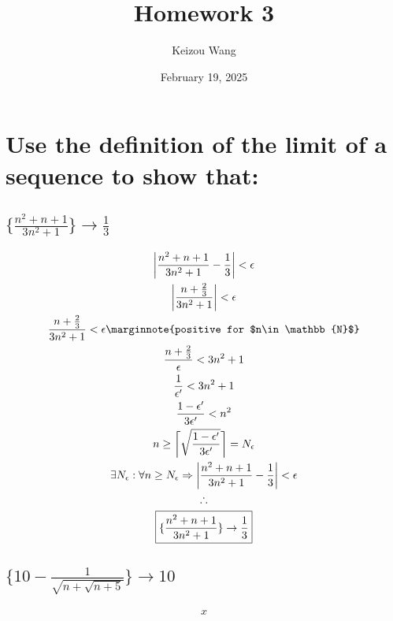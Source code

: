 \documentclass[letterpaper]{article}
\title{Homework 3}
\author{Keizou Wang}
\date{February 19, 2025}
\DeclarePairedDelimiter{\ceil}{\lceil}{\rceil}
\DeclarePairedDelimiter\abs{\lvert}{\rvert}
\begin{document}
\maketitle

\section{Use the definition of the limit of a sequence to show that:}
\subsection{$\{\frac{n^2+n+1}{3n^2+1}\}\rightarrow\frac{1}{3}$}
\begin{gather*}
\abs[\bigg]{\frac{n^2+n+1}{3n^2+1}-\frac{1}{3}}<\epsilon \\
\abs[\bigg]{\frac{n+\frac{2}{3}}{3n^2+1}}<\epsilon \\
\frac{n+\frac{2}{3}}{3n^2+1}<\epsilon \marginnote{positive for $n\in\mathbb{N}$} \\
\frac{n+\frac{2}{3}}{\epsilon}<3n^2+1 \\
\frac{1}{\epsilon'}<3n^2+1 \\
\frac{1-\epsilon'}{3\epsilon'}<n^2 \\
n\geq\ceil[\bigg]{\sqrt{\frac{1-\epsilon'}{3\epsilon'}}}=N_\epsilon \\
\exists N_\epsilon:\forall n\geq N_\epsilon\Rightarrow\abs[\bigg]{\frac{n^2+n+1}{3n^2+1}-\frac{1}{3}}<\epsilon \\
\therefore \\
\boxed{\{\frac{n^2+n+1}{3n^2+1}\}\rightarrow\frac{1}{3}}
\end{gather*}
\subsection{$\{10-\frac{1}{\sqrt{n+\sqrt{n+5}}}\}\rightarrow10$}
\begin{gather*}
x
\end{gather*}
\end{document}
